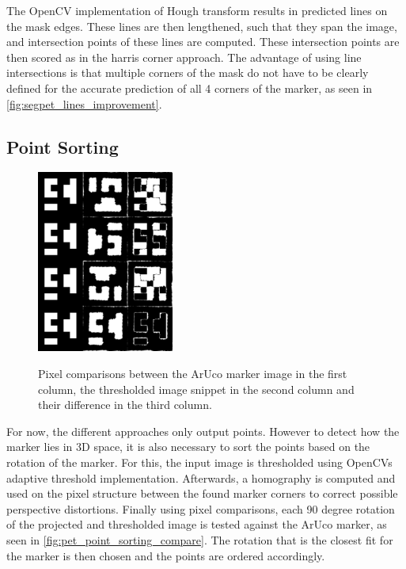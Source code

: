 \documentclass[10pt]{book}
\newcommand{\figureref}[1]{\autoref{#1}}
\begin{document}
The \ac{OpenCV} implementation of Hough transform results in predicted lines on the mask edges. These lines are then lengthened, such that they span the image, and intersection points of these lines are computed. These intersection points are then scored as in the harris corner approach. The advantage of using line intersections is that multiple corners of the mask do not have to be clearly defined for the accurate prediction of all 4 corners of the marker, as seen in \figureref{fig:segpet_lines_improvement}. %

\subsection{Point Sorting}

\begin{figure}
  \caption{Pixel comparisons between the \ac{ArUco} marker image in the first column, the thresholded image snippet in the second column and their difference in the third column.}
  \includegraphics[width=0.4\textwidth]{image/pet_point_sorting_compare}
  \label{fig:pet_point_sorting_compare}
\end{figure}

For now, the different approaches only output points. However to detect how the marker lies in 3D space, it is also necessary to sort the points based on the rotation of the marker. For this, the input image is thresholded using \acp{OpenCV} adaptive threshold implementation. Afterwards, a homography is computed and used on the pixel structure between the found marker corners to correct possible perspective distortions. Finally using pixel comparisons, each 90 degree rotation of the projected and thresholded image is tested against the \ac{ArUco} marker, as seen in \figureref{fig:pet_point_sorting_compare}. The rotation that is the closest fit for the marker is then chosen and the points are ordered accordingly.
\end{document}
